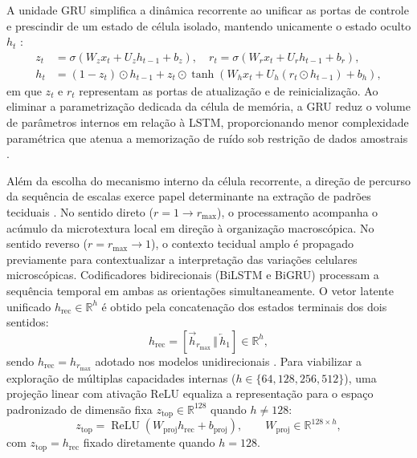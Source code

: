A unidade GRU simplifica a dinâmica recorrente ao unificar as portas de controle e prescindir de um estado de célula isolado, mantendo unicamente o estado oculto $h_t$ \cite{cho2014learning}:
\begin{align}
z_t &= \sigma\!\left(W_z x_t + U_z h_{t-1} + b_z\right), \quad r_t = \sigma\!\left(W_r x_t + U_r h_{t-1} + b_r\right), \label{eq:gru-portas}\\
h_t &= (1 - z_t) \odot h_{t-1} + z_t \odot \tanh\!\left(W_h x_t + U_h (r_t \odot h_{t-1}) + b_h\right), \label{eq:gru-estado}
\end{align}
em que $z_t$ e $r_t$ representam as portas de atualização e de reinicialização. Ao eliminar a parametrização dedicada da célula de memória, a GRU reduz o volume de parâmetros internos em relação à LSTM, proporcionando menor complexidade paramétrica que atenua a memorização de ruído sob restrição de dados amostrais \cite{cho2014learning,greff2017lstm}.

Além da escolha do mecanismo interno da célula recorrente, a direção de percurso da sequência de escalas exerce papel determinante na extração de padrões teciduais \cite{schuster1997bidirectional,graves2005framewise}. No sentido direto ($r = 1 \to r_{\max}$), o processamento acompanha o acúmulo da microtextura local em direção à organização macroscópica. No sentido reverso ($r = r_{\max} \to 1$), o contexto tecidual amplo é propagado previamente para contextualizar a interpretação das variações celulares microscópicas. Codificadores bidirecionais (BiLSTM e BiGRU) processam a sequência temporal em ambas as orientações simultaneamente. O vetor latente unificado $h_{\mathrm{rec}} \in \mathbb{R}^h$ é obtido pela concatenação dos estados terminais dos dois sentidos:
\begin{equation}
h_{\mathrm{rec}} = \left[\overrightarrow{h}_{r_{\max}}\,\Vert\,\overleftarrow{h}_{1}\right] \in \mathbb{R}^{h},
\label{eq:top-embedding-bi}
\end{equation}
sendo $h_{\mathrm{rec}} = h_{r_{\max}}$ adotado nos modelos unidirecionais \cite{lin2022mslstm,priyadarshini2026cnnbilstm}. Para viabilizar a exploração de múltiplas capacidades internas ($h \in \{64, 128, 256, 512\}$), uma projeção linear com ativação ReLU equaliza a representação para o espaço padronizado de dimensão fixa $z_{\mathrm{top}} \in \mathbb{R}^{128}$ quando $h \neq 128$:
\begin{equation}
z_{\mathrm{top}} = \operatorname{ReLU}(W_{\mathrm{proj}} h_{\mathrm{rec}} + b_{\mathrm{proj}}), \qquad W_{\mathrm{proj}} \in \mathbb{R}^{128 \times h},
\label{eq:top-proj-padrao}
\end{equation}
com $z_{\mathrm{top}} = h_{\mathrm{rec}}$ fixado diretamente quando $h = 128$.


